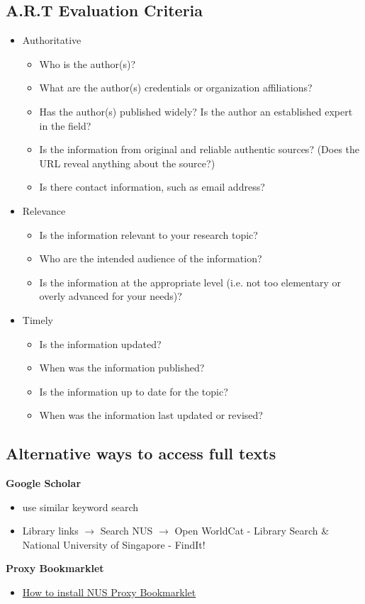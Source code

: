 \documentclass{article}
\begin{document}
\begin{multicols}{2}
\subsection{A.R.T Evaluation Criteria}
\begin{itemize}
	\item Authoritative
	\begin{itemize}
		\item Who is the author(s)?
		\item What are the author(s) credentials or organization affiliations?
		\item Has the author(s) published widely? Is the author an established expert in the field?
		\item Is the information from original and reliable authentic sources? (Does the URL reveal anything about the source?)
		\item Is there contact information, such as email address?
	\end{itemize}
	\item Relevance
	\begin{itemize}
		\item Is the information relevant to your research topic?
		\item Who are the intended audience of the information?
		\item Is the information at the appropriate level (i.e. not too elementary or overly advanced for your needs)?
	\end{itemize}
	\item Timely
	\begin{itemize}
		\item Is the information updated?
		\item When was the information published?
		\item Is the information up to date for the topic?
		\item When was the information last updated or revised?
	\end{itemize}
\end{itemize}

\subsection{Alternative ways to access full texts}
\textbf{Google Scholar}
\begin{itemize}
	\item use similar keyword search
	\item Library links $\rightarrow$ Search NUS $\rightarrow$ Open WorldCat - Library Search \& National University of Singapore - FindIt!
\end{itemize}
\textbf{Proxy Bookmarklet}
\begin{itemize}
	\item \href{https://libguides.nus.edu.sg/findfulltext/proxybookmark}{How to install NUS Proxy Bookmarklet}
\end{itemize}



\end{multicols}
\end{document}
